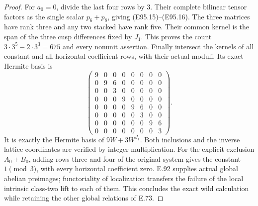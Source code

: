 \begin{proof}
For $a_0=0$, divide the last four rows by $3$.
Their complete bilinear tensor factors as the
single scalar $p_6+p_8$, giving (E95.15)--(E95.16).
The three matrices have rank three and any two
stacked have rank five. Their common kernel is
the span of the three cusp differences fixed by
$J_1$. This proves the count $3\cdot3^5-2\cdot3^3=675$
and every nonunit assertion. Finally intersect
the kernels of all constant and all horizontal
coefficient rows, with their actual moduli. Its
exact Hermite basis is
\[
\begin{pmatrix}
9&0&0&0&0&0&0&0\\0&9&6&0&0&0&0&0\\
0&0&3&0&0&0&0&0\\0&0&0&9&0&0&0&0\\
0&0&0&0&9&6&0&0\\0&0&0&0&0&3&0&0\\
0&0&0&0&0&0&9&6\\0&0&0&0&0&0&0&3
\end{pmatrix}.
 \tag{E95.42}
\]
It is exactly the Hermite basis of $9W+3W^{J_1}$.
Both inclusions and the inverse lattice coordinates
are verified by integer multiplication. For the
explicit exclusion $A_0+B_0$, adding rows three
and four of the original system gives the constant
$1\pmod3$, with every horizontal coefficient zero.
E.92 supplies actual global abelian preimages;
functoriality of localization transfers the failure
of the local intrinsic class-two lift to each of them.
This concludes the exact wild calculation while
retaining the other global relations of E.73.
\end{proof}
